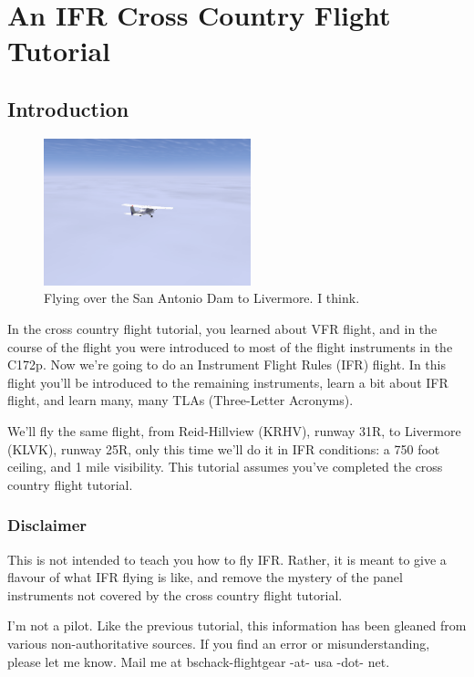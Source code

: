 \chapter{An IFR Cross Country Flight Tutorial\label{ifr}}

\section{Introduction}

\begin{figure}[h]
  \begin{center}
    \includegraphics[width=6cm]{img/somewhere}
    \caption{Flying over the San Antonio Dam to Livermore.  I think.}
    \label{fig:somewhere}
  \end{center}
\end{figure}

In the cross country flight tutorial, you learned about VFR flight,
and in the course of the flight you were introduced to most of the
flight instruments in the C172p.  Now we're going to do an Instrument
Flight Rules (IFR) flight.  In this flight you'll be introduced to the
remaining instruments, learn a bit about IFR flight, and learn many,
many TLAs (Three-Letter Acronyms).

We'll fly the same flight, from Reid-Hillview (KRHV), runway 31R, to
Livermore (KLVK), runway 25R, only this time we'll do it in IFR
conditions: a 750 foot ceiling, and 1 mile visibility.  This tutorial
assumes you've completed the cross country flight tutorial.

\subsection{Disclaimer}

This is not intended to teach you how to fly IFR.  Rather, it is meant
to give a flavour of what IFR flying is like, and remove the mystery
of the panel instruments not covered by the cross country flight
tutorial.

I'm not a pilot.  Like the previous tutorial, this information has
been gleaned from various non-authoritative sources.  If you find an
error or misunderstanding, please let me know.  Mail me at
bschack-flightgear -at- usa -dot- net.

